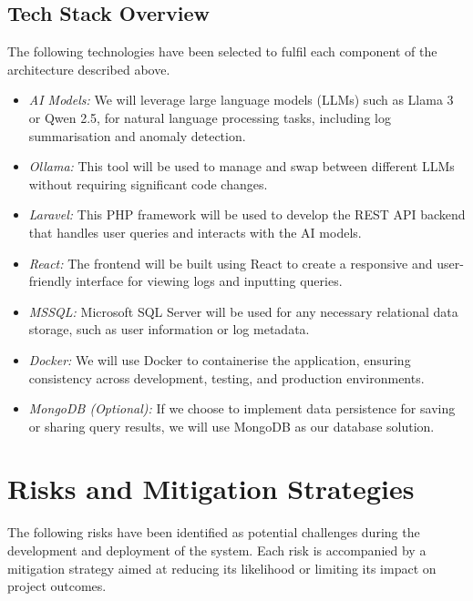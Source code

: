 \documentclass[12pt, a4paper]{article}
\begin{document}
\subsection{Tech Stack Overview}
The following technologies have been selected to fulfil each component of the architecture described above.
\begin{itemize}
    \item \textit{AI Models:} We will leverage large language models (LLMs) such as Llama 3 or Qwen 2.5, for natural language processing tasks, including log summarisation and anomaly detection.
    \item \textit{Ollama:} This tool will be used to manage and swap between different LLMs without requiring significant code changes.
    \item \textit{Laravel:} This PHP framework will be used to develop the REST API backend that handles user queries and interacts with the AI models.
    \item \textit{React:} The frontend will be built using React to create a responsive and user-friendly interface for viewing logs and inputting queries.
    \item \textit{MSSQL:} Microsoft SQL Server will be used for any necessary relational data storage, such as user information or log metadata.
    \item \textit{Docker:} We will use Docker to containerise the application, ensuring consistency across development, testing, and production environments.
    \item \textit{MongoDB (Optional):} If we choose to implement data persistence for saving or sharing query results, we will use MongoDB as our database solution.
\end{itemize}

\section{Risks and Mitigation Strategies}

The following risks have been identified as potential challenges during the development and deployment of the system. Each risk is accompanied by a mitigation strategy aimed at reducing its likelihood or limiting its impact on project outcomes.
\end{document}
